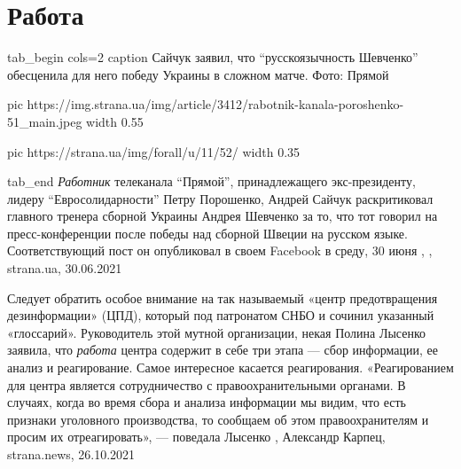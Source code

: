  
 
 
 
 
\chapter{Работа}
\label{sec:slova.rabota}

\ifcmt
tab_begin cols=2
	caption Сайчук заявил, что \enquote{русскоязычность Шевченко} обесценила для него победу Украины в сложном матче. Фото: Прямой

  pic https://img.strana.ua/img/article/3412/rabotnik-kanala-poroshenko-51_main.jpeg
	width 0.55

	pic https://strana.ua/img/forall/u/11/52/%
	width 0.35

tab_end
\fi
\emph{Работник} телеканала \enquote{Прямой}, принадлежащего экс-президенту, лидеру
\enquote{Евросолидарности} Петру Порошенко, Андрей Сайчук раскритиковал главного
тренера сборной Украины Андрея Шевченко за то, что тот говорил на
пресс-конференции после победы над сборной Швеции на русском языке.
Соответствующий пост он опубликовал в своем Facebook в среду, 30 июня
, , strana.ua, 30.06.2021

Следует обратить особое внимание на так называемый «центр предотвращения
дезинформации» (ЦПД), который под патронатом СНБО и сочинил указанный
«глоссарий». Руководитель этой мутной организации, некая Полина Лысенко
заявила, что \emph{работа} центра содержит в себе три этапа — сбор информации, ее
анализ и реагирование. Самое интересное касается реагирования.  «Реагированием
для центра является сотрудничество с правоохранительными органами. В случаях,
когда во время сбора и анализа информации мы видим, что есть признаки
уголовного производства, то сообщаем об этом правоохранителям и просим их
отреагировать», — поведала Лысенко
, 
Александр Карпец, strana.news, 26.10.2021
